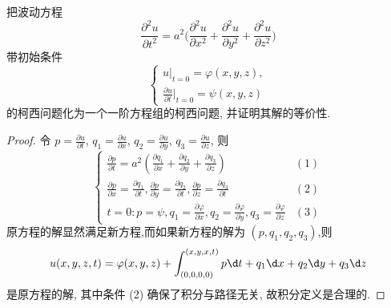 
\begin{exercise}
  把波动方程
  \[\frac{\partial^2u}{\partial t^2} = a^2 
    \biggl(\frac{\partial^2u}{\partial x^2} + \frac{\partial^2u}{\partial y^2}
    + \frac{\partial^2u}{\partial z^2}\biggr)\]
  带初始条件
  \[\begin{cases}
    u|_{t=0} = \varphi(x,y,z), \\
    \frac{\partial u}{\partial t}|_{t=0} = \psi(x,y,z)
  \end{cases}\]
  的柯西问题化为一个一阶方程组的柯西问题, 并证明其解的等价性.
\end{exercise}

\begin{proof}
  令 $p=\frac{\partial u}{\partial t}$, $q_1=\frac{\partial u}{\partial x}$,
  $q_2=\frac{\partial u}{\partial y}$, $q_3=\frac{\partial u}{\partial z}$, 则
  \[\begin{cases}
    \frac{\partial p}{\partial t} = a^2\left(\frac{\partial q_1}{\partial x}
      +\frac{\partial q_2}{\partial y}+\frac{\partial q_3}{\partial z}\right) & (1) \\
    \frac{\partial p}{\partial x} = \frac{\partial q_1}{\partial t},
    \frac{\partial p}{\partial y}=\frac{\partial q_2}{\partial t},
    \frac{\partial p}{\partial z}=\frac{\partial q_3}{\partial t} & (2) \\
    t = 0: p=\psi, q_1 = \frac{\partial\varphi}{\partial x},
                   q_2 = \frac{\partial\varphi}{\partial y},
                   q_3 = \frac{\partial\varphi}{\partial z} & (3)
  \end{cases}\]
  原方程的解显然满足新方程,而如果新方程的解为 $(p,q_1,q_2,q_3)$,则
  \[u(x,y,z,t) = \varphi(x,y,z)
    + \int_{(0,0,0,0)}^{(x,y,x,t)}p\d t+q_1\d x+q_2\d y+q_3\d z\]
  是原方程的解, 其中条件 (2) 确保了积分与路径无关, 故积分定义是合理的.
\end{proof}


